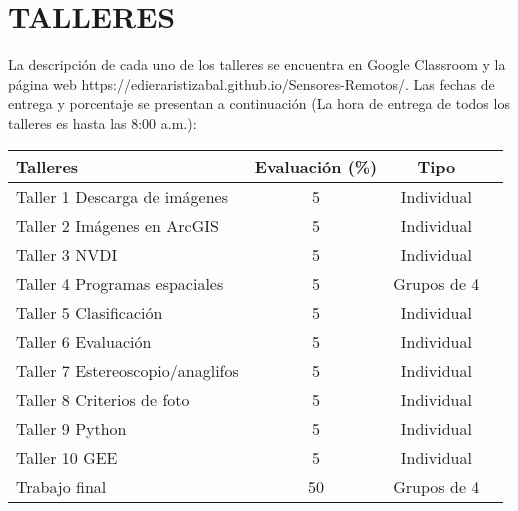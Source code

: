 \documentclass[a4paper,twoside,11pt,]{article}
\begin{document}
\section{TALLERES}
La descripción de cada uno de los talleres se encuentra en Google Classroom y la página web https://edieraristizabal.github.io/Sensores-Remotos/. Las fechas de entrega y porcentaje se presentan a continuación (La hora de entrega de todos los talleres es hasta las 8:00 a.m.):\\
\begin{table}[!hbt]
\label{tab-marks}
\begin{tabular}{|l|c|c|c|}
\hline {\bf Talleres} & {\bf Evaluación (\%)} & {\bf Tipo} \\
\hline Taller 1 Descarga de imágenes &  5 & Individual\\
\hline Taller 2 Imágenes en ArcGIS & 5 & Individual\\
\hline Taller 3 NVDI & 5 & Individual\\
\hline Taller 4 Programas espaciales &  5 & Grupos de 4\\
\hline Taller 5 Clasificación & 5 & Individual\\
\hline Taller 6 Evaluación & 5 & Individual\\
\hline Taller 7 Estereoscopio/anaglifos &  5 & Individual\\
\hline Taller 8 Criterios de foto & 5 & Individual\\
\hline Taller 9 Python  & 5 & Individual\\
\hline Taller 10 GEE  & 5 & Individual\\
\hline Trabajo final & 50 & Grupos de 4\\
\hline
\end{tabular}
\end{table}
\end{document}
